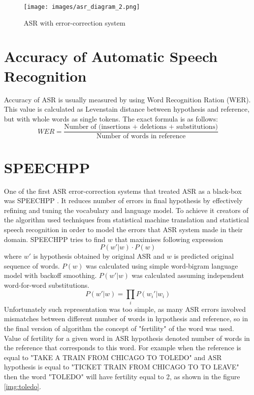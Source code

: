 \documentclass[a4paper,11pt,twoside]{report}
\theoremstyle{definition}
\begin{document}
\begin{figure}[H]{}
    \centering
    \texttt{[image: images/asr\_diagram\_2.png]}
    \caption{ASR with error-correction system}
    \label{img:asrworkflow2}
\end{figure}

\section{Accuracy of Automatic Speech Recognition}

Accuracy of ASR is usually measured by using Word Recognition Ration (WER). This value is calculated as Levenstain distance between hypothesis and reference, but with whole words as single tokens. The exact formula is as follows:
$$
WER = \frac{\text{Number of (insertions + deletions + substitutions)}}{\text{Number of words in reference}}
$$


\section{SPEECHPP}

One of the first ASR error-correction systems that treated ASR as a black-box was SPEECHPP \cite{Fertility}. It reduces number of errors in final hypothesis by effectively refining and tuning the
vocabulary and language model. To achieve it creators of the algorithm used techniques from
statistical machine translation and statistical speech recognition in order to model the errors that ASR system made in their domain. SPEECHPP tries to find $w$ that maximises following expression 
$$
P(w'|w) \cdot P(w)
$$
where $w'$ is hypothesis obtained by original ASR and $w$ is predicted original sequence of words. $P(w)$ was calculated using simple word-bigram language model with backoff smoothing.  $P(w'|w)$ was calculated assuming independent word-for-word substitutions.
$$
P(w'|w) = \prod_i{P(w_i'|w_i)}
$$
Unfortunately such representation was too simple, as many ASR errors involved mismatches between different number of words in hypothesis and reference, so in the final version of algorithm the concept of "fertility" of the word was used. Value of fertility for a given word in ASR hypothesis denoted number of words in the reference that corresponds to this word. For example when the reference is equal to "TAKE A TRAIN FROM CHICAGO TO TOLEDO" and ASR hypothesis is equal to "TICKET TRAIN FROM CHICAGO TO TO LEAVE" then the word "TOLEDO" will have fertility equal to 2, as shown in the figure \ref{img:toledo}.
\end{document}
